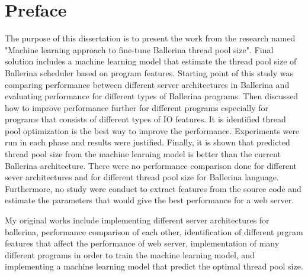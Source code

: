 \chapter*{Preface}

The purpose of this dissertation is to present the work from the research named "Machine learning approach to fine-tune Ballerina thread pool size". Final solution includes a machine learning model that estimate the thread pool size of Ballerina scheduler based on program features. Starting point of this study was comparing performance between different server architectures in Ballerina and evaluating performance for different types of Ballerina programs. Then discussed how to improve performance further for different programs especially for programs that consists of different types of IO features. It is identified thread pool optimization is the best way to improve the performance. Experiments were run in each phase and results were justified. Finally, it is shown that predicted thread pool size from the machine learning model is better than the current Ballerina architecture. There were no performance comparison done for different sever architectures and for different thread pool size for Ballerina language. Furthermore, no study were conduct to extract features from the source code and estimate the parameters that would give the best performance for a web server. 

My original works include implementing different server architectures for ballerina, performance comparison of each other, identification of different prgram features that affect the performance of web server, implementation of many different programs in order to train the machine learning model, and implementing a machine learning model that predict the optimal thread pool size.